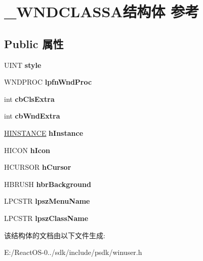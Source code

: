\hypertarget{struct___w_n_d_c_l_a_s_s_a}{}\section{\+\_\+\+W\+N\+D\+C\+L\+A\+S\+S\+A结构体 参考}
\label{struct___w_n_d_c_l_a_s_s_a}
\subsection*{Public 属性}
\begin{DoxyCompactItemize}
\item 
\mbox{\label{struct___w_n_d_c_l_a_s_s_a_a9730b85c5e5a26524d2e5d6d44028617}} 
U\+I\+NT {\bfseries style}
\item 
\mbox{\label{struct___w_n_d_c_l_a_s_s_a_ac86ce6acb3675aef9cef750034125e94}} 
W\+N\+D\+P\+R\+OC {\bfseries lpfn\+Wnd\+Proc}
\item 
\mbox{\label{struct___w_n_d_c_l_a_s_s_a_ada0000fe76618418e5c13a0068bbeeaf}} 
int {\bfseries cb\+Cls\+Extra}
\item 
\mbox{\label{struct___w_n_d_c_l_a_s_s_a_a88270a0f8ce1ad68f148702a20faa1b8}} 
int {\bfseries cb\+Wnd\+Extra}
\item 
\mbox{\label{struct___w_n_d_c_l_a_s_s_a_a6c9582c67059885dc655bdb386120480}} 
\hyperlink{interfacevoid}{H\+I\+N\+S\+T\+A\+N\+CE} {\bfseries h\+Instance}
\item 
\mbox{\label{struct___w_n_d_c_l_a_s_s_a_a53d8f50febd6e53be8d0cf3dc5915f0d}} 
H\+I\+C\+ON {\bfseries h\+Icon}
\item 
\mbox{\label{struct___w_n_d_c_l_a_s_s_a_a7db4dcfd4b943eb17397b587c7464ab1}} 
H\+C\+U\+R\+S\+OR {\bfseries h\+Cursor}
\item 
\mbox{\label{struct___w_n_d_c_l_a_s_s_a_a2276ae633ff891028d12a8607d30d332}} 
H\+B\+R\+U\+SH {\bfseries hbr\+Background}
\item 
\mbox{\label{struct___w_n_d_c_l_a_s_s_a_a9fec5d02b4f17a60464efb1a25bb5d72}} 
L\+P\+C\+S\+TR {\bfseries lpsz\+Menu\+Name}
\item 
\mbox{\label{struct___w_n_d_c_l_a_s_s_a_ab9803c703c075b215577b7787711cf14}} 
L\+P\+C\+S\+TR {\bfseries lpsz\+Class\+Name}
\end{DoxyCompactItemize}


该结构体的文档由以下文件生成\+:\begin{DoxyCompactItemize}
\item 
E\+:/\+React\+O\+S-\/0../sdk/include/psdk/winuser.\+h\end{DoxyCompactItemize}
